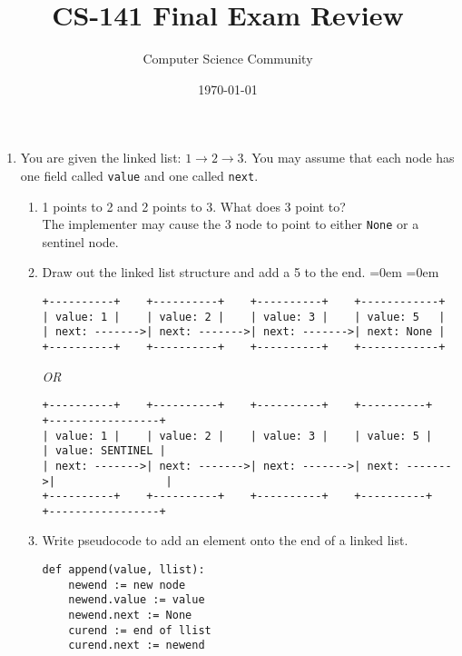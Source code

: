 \documentclass[11pt]{article}
\author{Computer Science Community}
\title{CS-141 Final Exam Review}
\date{\today}
\newenvironment{answer}{\large\lstset{basicstyle=\tiny\ttfamily}\color{white}}{}
\newenvironment{answer}{\large\lstset{basicstyle=\large\ttfamily}\color{red}}{}
\begin{document}
\header

\begin{enumerate}


\section*{Linked Lists}
    \item You are given the linked list: $1 \rightarrow 2 \rightarrow 3$.  You may assume that each node has one field called \texttt{value} and one called \texttt{next}.
        \begin{enumerate}
            \item 1 points to 2 and 2 points to 3. What does 3 point to? \\
                \begin{answer}
				The implementer may cause the 3 node to point to either \texttt{None} or a sentinel node.
				\end{answer}
            \item Draw out the linked list structure and add a 5 to the end.
				\begin{answer}
				\leftmargin=0em
				\itemindent=0em
				{ \small
				\begin{verbatim}
+----------+    +----------+    +----------+    +------------+
| value: 1 |    | value: 2 |    | value: 3 |    | value: 5   |
| next: ------->| next: ------->| next: ------->| next: None |
+----------+    +----------+    +----------+    +------------+
				\end{verbatim}
				\textit{OR}
				\begin{verbatim}
+----------+    +----------+    +----------+    +----------+    +-----------------+
| value: 1 |    | value: 2 |    | value: 3 |    | value: 5 |    | value: SENTINEL |
| next: ------->| next: ------->| next: ------->| next: ------->|                 |
+----------+    +----------+    +----------+    +----------+    +-----------------+
				\end{verbatim} }
				\end{answer}
            \item Write pseudocode to add an element onto the end of a linked list.
				\begin{answer}
				\begin{lstlisting}
def append(value, llist):
	newend := new node
	newend.value := value
	newend.next := None
	curend := end of llist
	curend.next := newend
				\end{lstlisting}

\end{answer}
\end{enumerate}
\end{enumerate}
\end{document}
